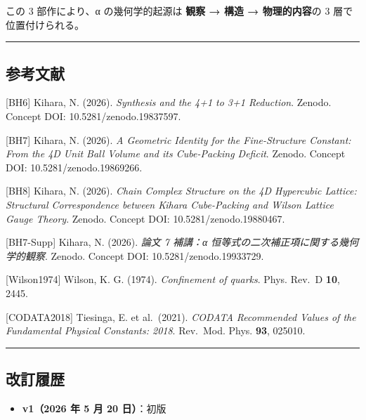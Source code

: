 \documentclass[
  11pt]{ltjsarticle}
\providecommand{\tightlist}{%
  \setlength{\itemsep}{0pt}\setlength{\parskip}{0pt}}
\begin{document}
この 3 部作により、α の幾何学的起源は \textbf{観察 → 構造 →
物理的内容}の 3 層で位置付けられる。

\begin{center}\rule{0.5\linewidth}{0.5pt}\end{center}

\subsection{参考文献}\label{ux53c2ux8003ux6587ux732e}

{[}BH6{]} Kihara, N. (2026). \emph{Synthesis and the 4+1 to 3+1
Reduction}. Zenodo. Concept DOI: 10.5281/zenodo.19837597.

{[}BH7{]} Kihara, N. (2026). \emph{A Geometric Identity for the
Fine-Structure Constant: From the 4D Unit Ball Volume and its
Cube-Packing Deficit}. Zenodo. Concept DOI: 10.5281/zenodo.19869266.

{[}BH8{]} Kihara, N. (2026). \emph{Chain Complex Structure on the 4D
Hypercubic Lattice: Structural Correspondence between Kihara
Cube-Packing and Wilson Lattice Gauge Theory}. Zenodo. Concept DOI:
10.5281/zenodo.19880467.

{[}BH7-Supp{]} Kihara, N. (2026). \emph{論文 7 補講：α
恒等式の二次補正項に関する幾何学的観察}. Zenodo. Concept DOI:
10.5281/zenodo.19933729.

{[}Wilson1974{]} Wilson, K. G. (1974). \emph{Confinement of quarks}.
Phys. Rev.~D \textbf{10}, 2445.

{[}CODATA2018{]} Tiesinga, E. et al.~(2021). \emph{CODATA Recommended
Values of the Fundamental Physical Constants: 2018}. Rev.~Mod. Phys.
\textbf{93}, 025010.

\begin{center}\rule{0.5\linewidth}{0.5pt}\end{center}

\subsection{改訂履歴}\label{ux6539ux8a02ux5c65ux6b74}

\begin{itemize}
\tightlist
\item
  \textbf{v1（2026 年 5 月 20 日）}：初版
\end{itemize}
\end{document}

